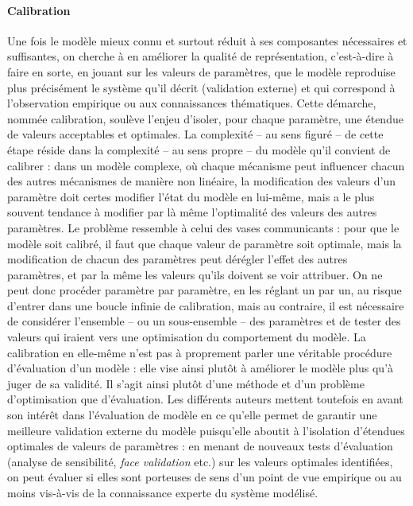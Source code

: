 \paragraph{Calibration}
Une fois le modèle mieux connu et surtout réduit à ses composantes nécessaires et suffisantes, on cherche à en améliorer la qualité de représentation, c'est-à-dire à faire en sorte, en jouant sur les valeurs de paramètres, que le modèle reproduise plus précisément le système qu'il décrit (validation externe) et qui correspond à l'observation empirique ou aux connaissances thématiques.
Cette démarche, nommée calibration, soulève l'enjeu d'isoler, pour chaque paramètre, une étendue de valeurs acceptables et optimales.
La complexité -- au sens figuré -- de cette étape réside dans la complexité -- au sens propre -- du modèle qu'il convient de calibrer :
	dans un modèle complexe, où chaque mécanisme peut influencer chacun des autres mécanismes de manière non linéaire, la modification des valeurs d'un paramètre doit certes modifier l'état du modèle en lui-même, mais a le plus souvent tendance à modifier par là même l'optimalité des valeurs des autres paramètres.
Le problème ressemble à celui des vases communicants :
	pour que le modèle soit calibré, il faut que chaque valeur de paramètre soit optimale, mais la modification de chacun des paramètres peut dérégler l'effet des autres paramètres, et par la même les valeurs qu'ils doivent se voir attribuer.
On ne peut donc procéder paramètre par paramètre, en les réglant un par un, au risque d'entrer dans une boucle infinie de calibration, mais au contraire, il est nécessaire de considérer l'ensemble -- ou un sous-ensemble -- des paramètres et de tester des valeurs qui iraient vers une optimisation du comportement du modèle.
La calibration en elle-même n'est pas à proprement parler une véritable procédure d'évaluation d'un modèle :
	elle vise ainsi plutôt à \og améliorer\fg{} le modèle plus qu'à juger de sa validité.
Il s'agit ainsi plutôt d'une méthode et d'un problème d'optimisation que d'évaluation.
Les différents auteurs mettent toutefois en avant son intérêt dans l'évaluation de modèle en ce qu'elle permet de garantir une meilleure validation externe du modèle puisqu'elle aboutit à l'isolation d'étendues optimales de valeurs de paramètres : en menant de nouveaux tests d'évaluation (analyse de sensibilité, \textit{face validation} etc.) \autocite[43]{klugl_validation_2008} sur les valeurs optimales identifiées, on peut évaluer si elles sont porteuses de sens d'un point de vue empirique ou au moins vis-à-vis de la connaissance experte du système modélisé.

